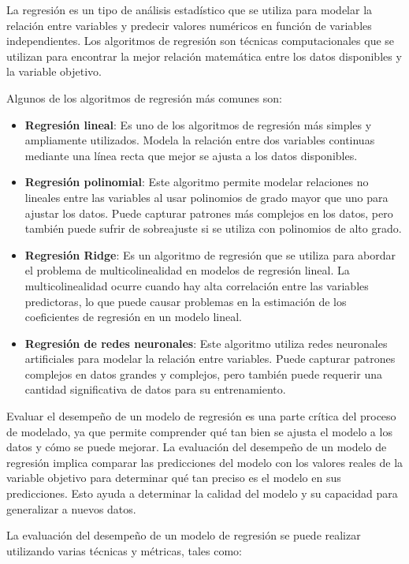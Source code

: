 La regresión es un tipo de análisis estadístico que se utiliza para modelar la relación entre variables y predecir valores numéricos en función de variables independientes. Los algoritmos de regresión son técnicas computacionales que se utilizan para encontrar la mejor relación matemática entre los datos disponibles y la variable objetivo.

Algunos de los algoritmos de regresión más comunes son:

\begin{itemize}
	\item \textbf{Regresión lineal}: Es uno de los algoritmos de regresión más simples y ampliamente utilizados. Modela la relación entre dos variables continuas mediante una línea recta que mejor se ajusta a los datos disponibles.
	\item \textbf{Regresión polinomial}: Este algoritmo permite modelar relaciones no lineales entre las variables al usar polinomios de grado mayor que uno para ajustar los datos. Puede capturar patrones más complejos en los datos, pero también puede sufrir de sobreajuste si se utiliza con polinomios de alto grado.
	\item \textbf{Regresión Ridge}: Es un algoritmo de regresión que se utiliza para abordar el problema de multicolinealidad en modelos de regresión lineal. La multicolinealidad ocurre cuando hay alta correlación entre las variables predictoras, lo que puede causar problemas en la estimación de los coeficientes de regresión en un modelo lineal.
	\item \textbf{Regresión de redes neuronales}: Este algoritmo utiliza redes neuronales artificiales para modelar la relación entre variables. Puede capturar patrones complejos en datos grandes y complejos, pero también puede requerir una cantidad significativa de datos para su entrenamiento.
\end{itemize}

Evaluar el desempeño de un modelo de regresión es una parte crítica del proceso de modelado, ya que permite comprender qué tan bien se ajusta el modelo a los datos y cómo se puede mejorar. La evaluación del desempeño de un modelo de regresión implica comparar las predicciones del modelo con los valores reales de la variable objetivo para determinar qué tan preciso es el modelo en sus predicciones. Esto ayuda a determinar la calidad del modelo y su capacidad para generalizar a nuevos datos.

La evaluación del desempeño de un modelo de regresión se puede realizar utilizando varias técnicas y métricas, tales como:

